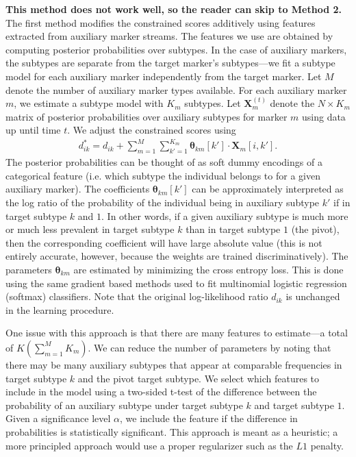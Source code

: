 \documentclass[12pt]{article}
\newcommand{\psup}[1]{^{(#1)}}
\begin{document}
\textbf{This method does not work well, so the reader can skip to Method 2.}
The first method modifies the constrained scores additively using features extracted from auxiliary marker streams. The features we use are obtained by computing posterior probabilities over subtypes. In the case of auxiliary markers, the subtypes are separate from the target marker's subtypes---we fit a subtype model for each auxiliary marker independently from the target marker. Let $M$ denote the number of auxiliary marker types available. For each auxiliary marker $m$, we estimate a subtype model with $K_m$ subtypes. Let $\bm{X}_m\psup{t}$ denote the $N \times K_m$ matrix of posterior probabilities over auxiliary subtypes for marker $m$ using data up until time $t$. We adjust the constrained scores using
\begin{align}
d^*_{ik} = d_{ik} + \sum_{m=1}^M \sum_{k'=1}^{K_m} \bm{\theta}_{km}[k'] \cdot \bm{X}_m[i,k'].
\end{align}
The posterior probabilities can be thought of as soft dummy encodings of a categorical feature (i.e. which subtype the individual belongs to for a given auxiliary marker). The coefficients $\bm{\theta}_{km}[k']$ can be approximately interpreted as the log ratio of the probability of the individual being in auxiliary subtype $k'$ if in target subtype $k$ and $1$. In other words, if a given auxiliary subtype is much more or much less prevalent in target subtype $k$ than in target subtype $1$ (the pivot), then the corresponding coefficient will have large absolute value (this is not entirely accurate, however, because the weights are trained discriminatively). The parameters $\bm{\theta}_{km}$ are estimated by minimizing the cross entropy loss. This is done using the same gradient based methods used to fit multinomial logistic regression (softmax) classifiers. Note that the original log-likelihood ratio $d_{ik}$ is unchanged in the learning procedure.

One issue with this approach is that there are many features to estimate---a total of $K ( \sum_{m=1}^M K_m )$. We can reduce the number of parameters by noting that there may be many auxiliary subtypes that appear at comparable frequencies in target subtype $k$ and the pivot target subtype. We select which features to include in the model using a two-sided t-test of the difference between the probability of an auxiliary subtype under target subtype $k$ and target subtype $1$. Given a significance level $\alpha$, we include the feature if the difference in probabilities is statistically significant. This approach is meant as a heuristic; a more principled approach would use a proper regularizer such as the $L1$ penalty.
\end{document}
